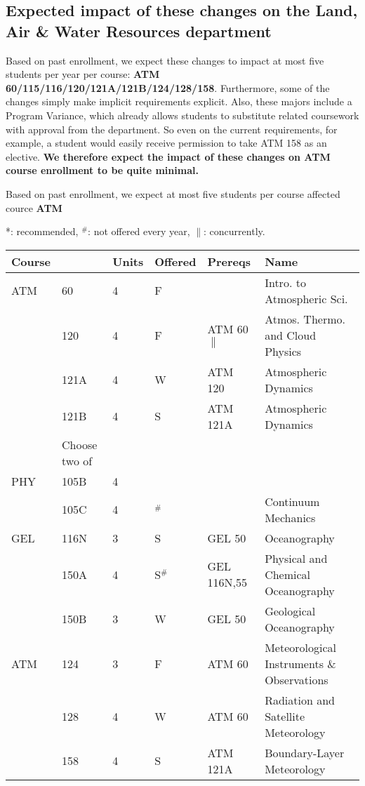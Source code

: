 \documentclass[12pt]{article}
\begin{document}
\subsection{Expected impact of these changes on the Land, Air \& Water Resources department}

Based on past enrollment, we expect these changes to impact at most
five students per year per course:
{\bf ATM 60/115/116/120/121A/121B/124/128/158}.
Furthermore, some of the changes simply make implicit requirements
explicit.  Also, these majors include a Program Variance, which
already allows students to substitute related coursework with approval
from the department.  So even on the current requirements, for
example, a student would easily receive permission to take ATM 158 as
an elective.
{\bf We therefore expect the impact of these changes on ATM course
  enrollment to be quite minimal.}


Based on past enrollment, we expect at most five students per course affected cource {\bf ATM}

\newpage
{}
\vskip 0.25cm
\noindent
*: recommended, $^\#$: not offered every year, $\parallel$: concurrently.\\
\begin{tabular}{|llllll|}
\hline
Course & & Units & Offered & Prereqs & Name \\
\hline
ATM & 60     & 4 & F   & & Intro. to Atmospheric Sci. \\
    & 120    & 4 & F   & ATM 60$\parallel$ & Atmos. Thermo. and Cloud Physics \\
    & 121A   & 4 & W   & ATM 120 & Atmospheric Dynamics \\
    & 121B   & 4 & S   & ATM 121A & Atmospheric Dynamics \\
\hline
\hline
    & Choose two of & & & & \\
\hline
PHY  & 105B   & 4 & & & \\
     & 105C   & 4 & $^\#$  &             & Continuum Mechanics\\
GEL  & 116N   & 3 & S  & GEL 50      & Oceanography\\
     & 150A   & 4 & S$^\#$ & GEL 116N,55 & Physical and Chemical Oceanography\\
     & 150B   & 3 & W  & GEL 50      & Geological Oceanography\\
ATM  & 124    & 3 & F  & ATM 60      & Meteorological Instruments \& Observations \\
     & 128    & 4 & W  & ATM 60      & Radiation and Satellite Meteorology \\
     & 158    & 4 & S  & ATM 121A    & Boundary-Layer Meteorology \\
\hline
\end{tabular}\\
\end{document}
